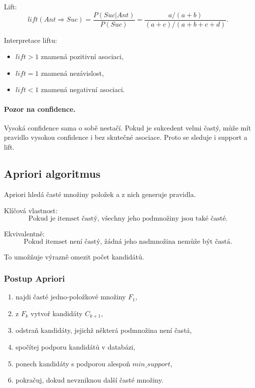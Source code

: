 Lift:
\[
lift(Ant\Rightarrow Suc)
=
\frac{P(Suc|Ant)}{P(Suc)}
=
\frac{a/(a+b)}{(a+c)/(a+b+c+d)}.
\]

Interpretace liftu:
\begin{itemize}
    \item $lift>1$ znamená pozitivní asociaci,
    \item $lift=1$ znamená nezávislost,
    \item $lift<1$ znamená negativní asociaci.
\end{itemize}

\paragraph{Pozor na confidence.}
Vysoká confidence sama o sobě nestačí. Pokud je sukcedent velmi častý, může mít pravidlo vysokou confidence
i bez skutečné asociace. Proto se sleduje i support a lift.

\subsection{Apriori algoritmus}

Apriori hledá časté množiny položek a z nich generuje pravidla.

Klíčová vlastnost:
\[
\text{Pokud je itemset častý, všechny jeho podmnožiny jsou také časté.}
\]

Ekvivalentně:
\[
\text{Pokud itemset není častý, žádná jeho nadmnožina nemůže být častá.}
\]

To umožňuje výrazně omezit počet kandidátů.

\subsubsection{Postup Apriori}

\begin{enumerate}
    \item najdi časté jedno-položkové množiny $F_1$,
    \item z $F_k$ vytvoř kandidáty $C_{k+1}$,
    \item odstraň kandidáty, jejichž některá podmnožina není častá,
    \item spočítej podporu kandidátů v databázi,
    \item ponech kandidáty s podporou alespoň $min\_support$,
    \item pokračuj, dokud nevzniknou další časté množiny.
\end{enumerate}

